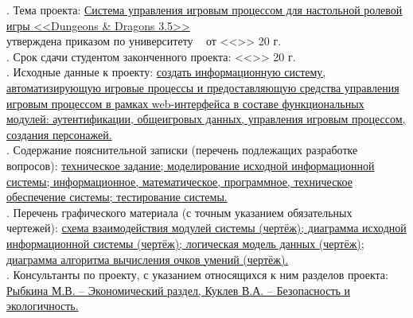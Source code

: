 . Тема проекта: \uline{Система управления игровым процессом для настольной ролевой игры <<Dungeons \& Dragons 3.5>>\hfill}\\
\noindent утверждена приказом по университету \No~\underline{\hspace{1.5cm}} от <<\underline{\hspace{1cm}}>>\underline{\hspace{3.5cm}} 20\underline{\hspace{0.8cm}} г.\\
. Срок сдачи студентом законченного проекта: \hspace{0.8cm} <<\underline{\hspace{1cm}}>>\underline{\hspace{3.5cm}} 20\underline{\hspace{0.8cm}} г.\\
. Исходные данные к проекту:
\uline{создать информационную систему, автоматизирующую игровые процессы и предоставляющую средства управления игровым процессом в рамках web-интерфейса в составе функциональных модулей: аутентификации, общеигровых данных, управления игровым процессом, создания персонажей.\hfill}\\
. Содержание пояснительной записки (перечень подлежащих разработке вопросов):
\uline{техническое задание; моделирование исходной информационной системы; информационное, математическое, программное, техническое обеспечение системы; тестирование системы.\hfill}\\
. Перечень графического материала (с точным указанием обязательных чертежей):
\uline{схема взаимодействия модулей системы (чертёж); диаграмма исходной информационной системы (чертёж); логическая модель данных (чертёж); диаграмма алгоритма вычисления очков умений (чертёж).\hfill}\\

. Консультанты по проекту, с указанием относящихся к ним разделов проекта:
\uline{Рыбкина М.В. – Экономический раздел, Куклев В.А. – Безопасность и экологичность.\hfill}

\restoregeometry

